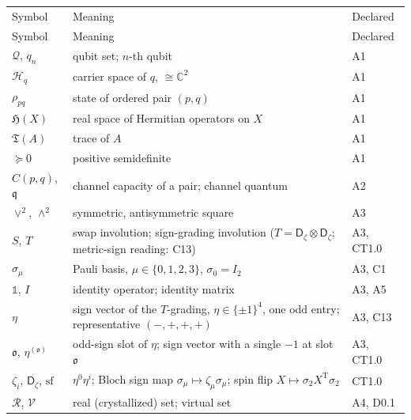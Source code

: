 {\footnotesize\setlength{\tabcolsep}{4pt}
\begin{longtable}{>{\raggedright\arraybackslash}p{}|>{\raggedright\arraybackslash}p{}|>{\raggedright\arraybackslash}p{}}
\toprule
Symbol & Meaning & Declared \\
\addlinespace[2pt]
\midrule
\endfirsthead
\toprule
Symbol & Meaning & Declared \\
\addlinespace[2pt]
\midrule
\endhead
\bottomrule
\endlastfoot
$\mathcal Q$, $q_n$ & qubit set; $n$-th qubit & A1 \\
$\mathcal H_q$ & carrier space of $q$, $\cong\mathbb C^2$ & A1 \\
$\rho_{pq}$ & state of ordered pair $(p,\allowbreak q)$ & A1 \\
$\mathfrak H(X)$ & real space of Hermitian operators on $X$ & A1 \\
$\mathfrak T(A)$ & trace of $A$ & A1 \\
$\succeq0$ & positive semidefinite & A1 \\
$C(p,\allowbreak q)$, $\mathfrak q$ & channel capacity of a pair; channel quantum & A2 \\
$\vee^2$, $\wedge^2$ & symmetric, antisymmetric square & A3 \\
$S$, $T$ & swap involution; sign-grading involution ($T=\allowbreak \mathsf D_\zeta\otimes\mathsf D_\zeta$; metric-sign reading: C13) & A3, CT1.0 \\
$\sigma_\mu$ & Pauli basis, $\mu\in\allowbreak \{0,1,2,3\}$, $\sigma_0=\allowbreak I_2$ & A3, C1 \\
$\mathbb1$, $I$ & identity operator; identity matrix & A3, A5 \\
$\eta$ & sign vector of the $T$-grading, $\eta\in\allowbreak \{\pm1\}^4$, one odd entry; representative $(-,\allowbreak +\allowbreak ,\allowbreak +\allowbreak ,\allowbreak +\allowbreak )$ & A3, C13 \\
$\mathfrak o$, $\eta^{(\mathfrak o)}$ & odd-sign slot of $\eta$; sign vector with a single $-1$ at slot $\mathfrak o$ & A3, CT1.0 \\
$\zeta_i$, $\mathsf D_\zeta$, $\mathrm{sf}$ & $\eta^0\eta^i$; Bloch sign map $\sigma_\mu\mapsto\allowbreak \zeta_\mu\sigma_\mu$; spin flip $X\mapsto\allowbreak \sigma_2X^{\mathrm T}\sigma_2$ & CT1.0 \\
$\mathcal R$, $\mathcal V$ & real (crystallized) set; virtual set & A4, D0.1 \\

\end{longtable}}
